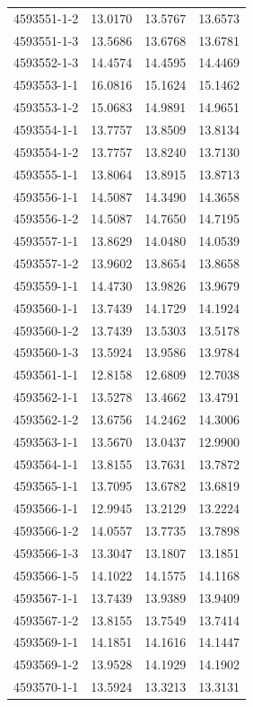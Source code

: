 \begin{longtable}{lrrr}
4593551-1-2 & 13.0170 & 13.5767 & 13.6573 \\
4593551-1-3 & 13.5686 & 13.6768 & 13.6781 \\
4593552-1-3 & 14.4574 & 14.4595 & 14.4469 \\
4593553-1-1 & 16.0816 & 15.1624 & 15.1462 \\
4593553-1-2 & 15.0683 & 14.9891 & 14.9651 \\
4593554-1-1 & 13.7757 & 13.8509 & 13.8134 \\
4593554-1-2 & 13.7757 & 13.8240 & 13.7130 \\
4593555-1-1 & 13.8064 & 13.8915 & 13.8713 \\
4593556-1-1 & 14.5087 & 14.3490 & 14.3658 \\
4593556-1-2 & 14.5087 & 14.7650 & 14.7195 \\
4593557-1-1 & 13.8629 & 14.0480 & 14.0539 \\
4593557-1-2 & 13.9602 & 13.8654 & 13.8658 \\
4593559-1-1 & 14.4730 & 13.9826 & 13.9679 \\
4593560-1-1 & 13.7439 & 14.1729 & 14.1924 \\
4593560-1-2 & 13.7439 & 13.5303 & 13.5178 \\
4593560-1-3 & 13.5924 & 13.9586 & 13.9784 \\
4593561-1-1 & 12.8158 & 12.6809 & 12.7038 \\
4593562-1-1 & 13.5278 & 13.4662 & 13.4791 \\
4593562-1-2 & 13.6756 & 14.2462 & 14.3006 \\
4593563-1-1 & 13.5670 & 13.0437 & 12.9900 \\
4593564-1-1 & 13.8155 & 13.7631 & 13.7872 \\
4593565-1-1 & 13.7095 & 13.6782 & 13.6819 \\
4593566-1-1 & 12.9945 & 13.2129 & 13.2224 \\
4593566-1-2 & 14.0557 & 13.7735 & 13.7898 \\
4593566-1-3 & 13.3047 & 13.1807 & 13.1851 \\
4593566-1-5 & 14.1022 & 14.1575 & 14.1168 \\
4593567-1-1 & 13.7439 & 13.9389 & 13.9409 \\
4593567-1-2 & 13.8155 & 13.7549 & 13.7414 \\
4593569-1-1 & 14.1851 & 14.1616 & 14.1447 \\
4593569-1-2 & 13.9528 & 14.1929 & 14.1902 \\
4593570-1-1 & 13.5924 & 13.3213 & 13.3131 \\

\end{longtable}

